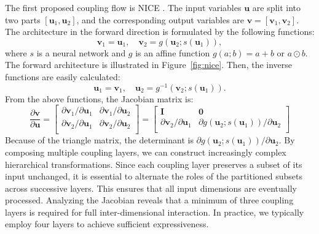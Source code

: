 The first proposed coupling flow is \ac{NICE} \citep{dinh2015nice}. The input variables $\boldsymbol{u}$ are split into two parts $[\boldsymbol{u}_1, \boldsymbol{u}_2]$, and the corresponding output variables are $\boldsymbol{v} = [\boldsymbol{v}_1, \boldsymbol{v}_2]$. The architecture in the forward direction is formulated by the following functions:
\begin{equation}
    \boldsymbol{v}_1 = \boldsymbol{u}_1, \quad \boldsymbol{v}_2 = g(\boldsymbol{u}_2;s(\boldsymbol{u}_1)),
\end{equation}
where $s$ is a neural network and $g$ is an affine function $g(a;b)=a+b$ or $a\odot b$. The forward architecture is illustrated in Figure~\ref{fig:nice}.
Then, the inverse functions are easily calculated:
\begin{equation}
    \boldsymbol{u}_1 = \boldsymbol{v}_1,\quad \boldsymbol{u}_2 = g^{-1}(\boldsymbol{v}_2;s(\boldsymbol{u}_1)).
\end{equation}
From the above functions, the Jacobian matrix is:
\begin{equation}
\frac {\partial \boldsymbol{v}}{\partial \boldsymbol{u}}=\begin{bmatrix}
\partial \boldsymbol{v}_1/\partial \boldsymbol{u}_1 & \partial \boldsymbol{v}_1/\partial \boldsymbol{u}_2 \\
\partial \boldsymbol{v}_2/\partial \boldsymbol{u}_1 & \partial \boldsymbol{v}_2/\partial \boldsymbol{u}_2\\
\end{bmatrix}=\begin{bmatrix}
\boldsymbol{I} & \boldsymbol{0} \\
\partial \boldsymbol{v}_2/\partial \boldsymbol{u}_1 & \partial g(\boldsymbol{u}_2;s(\boldsymbol{u}_1))/\partial \boldsymbol{u}_2\\
\end{bmatrix}
\end{equation}
Because of the triangle matrix, the determinant is $ \partial g(\boldsymbol{u}_2;s(\boldsymbol{u}_1))/\partial \boldsymbol{u}_2$.
By composing multiple coupling layers, we can construct increasingly complex hierarchical transformations. Since each coupling layer preserves a subset of its input unchanged, it is essential to alternate the roles of the partitioned subsets across successive layers. This ensures that all input dimensions are eventually processed. Analyzing the Jacobian reveals that a minimum of three coupling layers is required for full inter-dimensional interaction. In practice, we typically employ four layers to achieve sufficient expressiveness.

